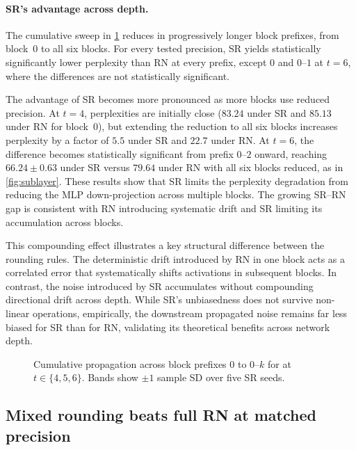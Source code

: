 \paragraph{SR's advantage across depth.}
The cumulative sweep in \cref{fig:cumulative} reduces  in
progressively longer block prefixes, from block~$0$ to all six blocks. For every
tested precision, SR yields statistically significantly lower perplexity than RN
at every prefix, except $0$ and $0$--$1$ at $t=6$, where the differences are not
statistically significant.

The advantage of SR becomes more pronounced as more blocks use reduced
precision. At $t=4$, perplexities are initially close ($83.24$ under SR and
$85.13$ under RN for block~$0$), but extending the reduction to all six blocks
increases perplexity by a factor of $5.5$ under SR and $22.7$ under RN. At
$t=6$, the difference becomes statistically significant from prefix $0$--$2$
onward, reaching $66.24\pm0.63$ under SR versus $79.64$ under RN with all six
blocks reduced, as in \cref{fig:sublayer}. These results show that SR limits the
perplexity degradation from reducing the MLP down-projection across multiple
blocks. The growing SR--RN gap is consistent with RN introducing systematic drift
and SR limiting its accumulation across blocks.

This compounding effect illustrates a key structural difference between the
rounding rules. The deterministic drift introduced by RN in one block acts as a
correlated error that systematically shifts activations in subsequent blocks. In
contrast, the noise introduced by SR accumulates without compounding directional
drift across depth. While SR's unbiasedness does not survive non-linear
operations, empirically, the downstream propagated noise remains far less biased
for SR than for RN, validating its theoretical benefits across network depth.

\begin{figure}[t]
  \centering
  \caption{Cumulative propagation across block prefixes $0$ to $0\text{--}k$ for  at $t \in \{4, 5, 6\}$. Bands show $\pm 1$ sample SD over five SR seeds.}
  \label{fig:cumulative}
\end{figure}


\subsection{Mixed rounding beats full RN at matched precision}
\label{sec:exp-composition}

